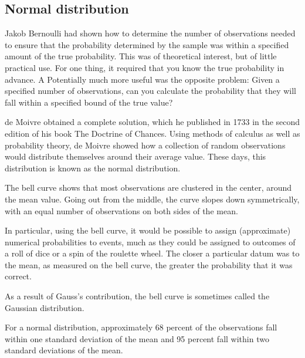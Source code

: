 \subsection{Normal distribution}

Jakob Bernoulli had shown how to determine the number of observations needed to ensure that the probability determined by the sample was within a specified amount of the true probability. This was of theoretical interest, but of little practical use. For one thing, it required that you know the true probability in advance. A Potentially much more useful was the opposite problem: Given a specified number of observations, can you calculate the probability that they will fall within a specified bound of the true value?

de Moivre obtained a complete solution, which he published in 1733 in the second edition of his book The Doctrine of Chances. Using methods of calculus as well as probability theory, de Moivre showed how a collection of random observations would distribute themselves around their average value. These days, this distribution is known as the normal distribution.


The bell curve shows that most observations are clustered in the center, around the mean value. Going out from the middle, the curve slopes down symmetrically, with an equal number of observations on both sides of the mean.

In particular, using the bell curve, it would be possible to assign (approximate) numerical probabilities to events, much as they could be assigned to outcomes of a roll of dice or a spin of the roulette wheel. The closer a particular datum was to the mean, as measured on the bell curve, the greater the probability that it was correct.

As a result of Gauss’s contribution, the bell curve is sometimes called the Gaussian distribution.


For a normal distribution, approximately 68 percent of the observations fall within one standard deviation of the mean and 95 percent fall within two standard deviations of the mean.


